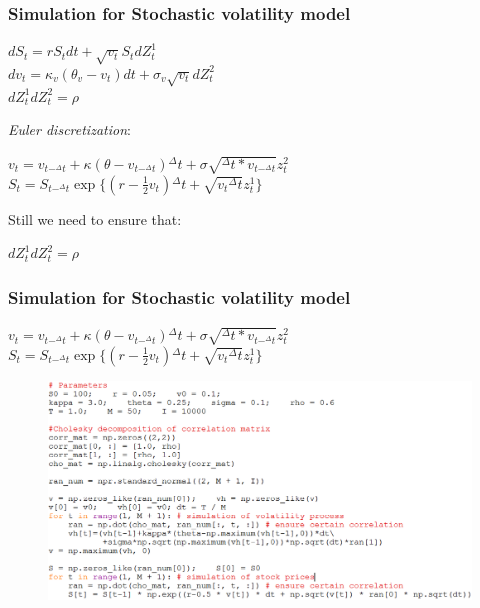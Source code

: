 \documentclass{beamer}
\begin{document}
\begin{frame}
\frametitle{Simulation for Stochastic volatility model}
\begin{center}
	$dS_{t} = rS_{t}dt + \sqrt{v_{t}}S_{t}dZ_{t}^{1}$\\[3mm]
	$dv_{t} = \kappa_{v}(\theta_{v}-v_{t})dt + \sigma_{v}\sqrt{v_{t}}dZ_{t}^{2}$\\[3mm]
	$dZ_{t}^{1}dZ_{t}^{2} = \rho $
\end{center}
\emph{Euler discretization}:
\begin{center}
	$v_{t} = v_{t-^{\Delta}t} + \kappa(\theta-v_{t-^{\Delta}t}){^{\Delta}t} + \sigma\sqrt{^{\Delta}t*v_{t-^{\Delta}t}}z_{t}^{2}$\\[3mm]
	$S_{t} = S_{t-^{\Delta}t} \exp\{(r-\frac{1}{2}v_{t}){^{\Delta}t}+\sqrt{v_{t}{^{\Delta}t}}z_{t}^{1}\}$
\end{center}
Still we need to ensure that:
\begin{center}
	$dZ_{t}^{1}dZ_{t}^{2} = \rho $
\end{center}
\end{frame}

\begin{frame}
\frametitle{Simulation for Stochastic volatility model}
\begin{center}
	$v_{t} = v_{t-^{\Delta}t} + \kappa(\theta-v_{t-^{\Delta}t}){^{\Delta}t} + \sigma\sqrt{^{\Delta}t*v_{t-^{\Delta}t}}z_{t}^{2}$
	$S_{t} = S_{t-^{\Delta}t} \exp\{(r-\frac{1}{2}v_{t}){^{\Delta}t}+\sqrt{v_{t}{^{\Delta}t}}z_{t}^{1}\}$
\end{center}
\begin{figure}[H]
	\includegraphics[scale=0.4]{stochastic_volatility.png}
\end{figure}
\end{frame}
\end{document}
